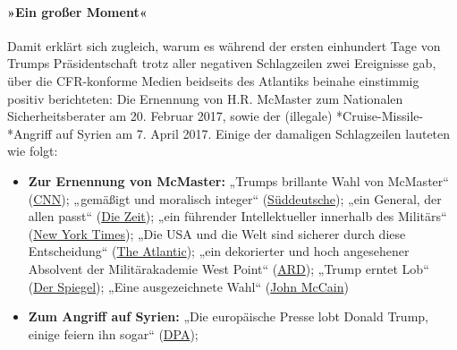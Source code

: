 \hypertarget{ein-grouxdfer-moment}{%
\paragraph{»Ein großer Moment«}\label{ein-grouxdfer-moment}}

Damit erklärt sich zugleich, warum es während der ersten einhundert Tage
von Trumps Präsidentschaft trotz aller negativen Schlagzeilen zwei
Ereignisse gab, über die CFR-konforme Medien beidseits des Atlantiks
beinahe einstimmig positiv berichteten: Die Ernennung von H.R. McMaster
zum Nationalen Sicherheitsberater am 20. Februar 2017, sowie der
(illegale) *Cruise-Missile-*Angriff auf Syrien am 7. April 2017. Einige
der damaligen Schlagzeilen lauteten wie folgt:

\begin{itemize}
\tightlist
\item
  \textbf{Zur Ernennung von McMaster:} „Trumps brillante Wahl von
  McMaster``
  (\href{http://edition.cnn.com/2017/02/20/opinions/trumps-brilliant-choice-of-mcmaster-bergen/index.html}{CNN});
  „gemäßigt und moralisch integer``
  (\href{http://www.sueddeutsche.de/politik/usa-trump-ernennt-hr-mcmaster-zum-nationalen-sicherheitsberater-1.3388283}{Süddeutsche});
  „ein General, der allen passt``
  (\href{http://www.zeit.de/politik/ausland/2017-02/h-r-mcmaster-donald-trump-nationaler-sicherheitsberater}{Die
  Zeit}); „ein führender Intellektueller innerhalb des Militärs``
  (\href{https://www.nytimes.com/2017/02/20/us/politics/mcmaster-national-security-adviser-trump.html}{New
  York Times}); „Die USA und die Welt sind sicherer durch diese
  Entscheidung``
  (\href{https://www.theatlantic.com/politics/archive/2017/02/trump-gets-an-upgrade-at-national-security-adviser/517278/}{The
  Atlantic}); „ein dekorierter und hoch angesehener Absolvent der
  Militärakademie West Point``
  (\href{https://web.archive.org/web/20170220203844/https://www.tagesschau.de/ausland/trump-sicherheitsberater-mcmaster-101.html}{ARD});
  „Trump erntet Lob``
  (\href{http://www.spiegel.de/politik/ausland/donald-trump-und-sein-neuer-sicherheitsberater-h-r-mcmaster-es-gibt-lob-a-1135527.html}{Der
  Spiegel}); „Eine ausgezeichnete Wahl``
  (\href{https://www.nytimes.com/2017/02/20/us/politics/mcmaster-national-security-adviser-trump.html}{John
  McCain})
\item
  \textbf{Zum Angriff auf Syrien:} „Die europäische Presse lobt Donald
  Trump, einige feiern ihn sogar``
  (\href{http://www.t-online.de/nachrichten/ausland/krisen/id_80852290/syrien-angriff-donald-trump-hat-ausnahmsweise-richtig-gehandelt-.html}{DPA});

\end{itemize}
